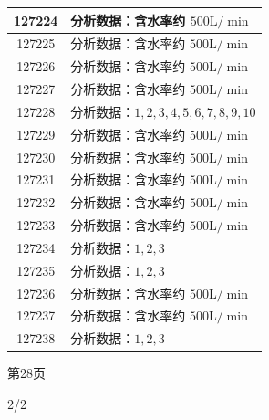 \documentclass[UTF8,10pt,a4paper,fontset=fandol]{ctexart}
\newcommand{\handwritten}[1]{#1}
\begin{document}
\begin{center}
\begin{minipage}[t]{0.47\textwidth}
\begin{tabularx}{\linewidth}{|c|X|}
127224 & 分析数据：含水率约 $500\mathrm{L}/\min$ \\ \hline
127225 & 分析数据：含水率约 $500\mathrm{L}/\min$ \\ \hline
127226 & 分析数据：含水率约 $500\mathrm{L}/\min$ \\ \hline
127227 & 分析数据：含水率约 $500\mathrm{L}/\min$ \\ \hline
127228 & 分析数据：$1,2,3,4,5,6,7,8,9,10$ \\ \hline
127229 & 分析数据：含水率约 $500\mathrm{L}/\min$ \\ \hline
127230 & 分析数据：含水率约 $500\mathrm{L}/\min$ \\ \hline
127231 & 分析数据：含水率约 $500\mathrm{L}/\min$ \\ \hline
127232 & 分析数据：含水率约 $500\mathrm{L}/\min$ \\ \hline
127233 & 分析数据：含水率约 $500\mathrm{L}/\min$ \\ \hline
127234 & 分析数据：$1,2,3$ \\ \hline
127235 & 分析数据：$1,2,3$ \\ \hline
127236 & 分析数据：含水率约 $500\mathrm{L}/\min$ \\ \hline
127237 & 分析数据：含水率约 $500\mathrm{L}/\min$ \\ \hline
127238 & 分析数据：$1,2,3$ \\ \hline
\end{tabularx}

\smallskip
第28页
\end{minipage}
\end{center}

\handwritten{2/2}

\newpage
\end{document}
